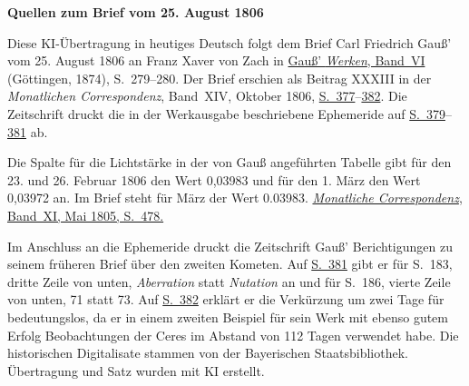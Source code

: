 \clearpage\thispagestyle{empty}
\begin{center}\textbf{Quellen zum Brief vom 25. August 1806}\end{center}
\noindent Diese KI-Übertragung in heutiges Deutsch folgt dem Brief Carl Friedrich Gauß’ vom 25. August 1806 an Franz Xaver von Zach in \href{https://gdz.sub.uni-goettingen.de/id/PPN236007467}{Gauß’ \textit{Werken}, Band~VI} (Göttingen, 1874), S.~279--280. Der Brief erschien als Beitrag XXXIII in der \textit{Monatlichen Correspondenz}, Band~XIV, Oktober 1806, \href{https://www.digitale-sammlungen.de/en/view/bsb10538606?page=393}{S.~377}--\href{https://www.digitale-sammlungen.de/en/view/bsb10538606?page=398}{382}. Die Zeitschrift druckt die in der Werkausgabe beschriebene Ephemeride auf \href{https://www.digitale-sammlungen.de/en/view/bsb10538606?page=395}{S.~379}--\href{https://www.digitale-sammlungen.de/en/view/bsb10538606?page=397}{381} ab.
\par\medskip
Die Spalte für die Lichtstärke in der von Gauß angeführten Tabelle gibt für den 23. und 26. Februar 1806 den Wert 0,03983 und für den 1. März den Wert 0,03972 an. Im Brief steht für März der Wert 0.03983. \href{https://www.digitale-sammlungen.de/en/view/bsb10538603?page=492}{\textit{Monatliche Correspondenz}, Band~XI, Mai 1805, S.~478.}
\par\medskip
Im Anschluss an die Ephemeride druckt die Zeitschrift Gauß’ Berichtigungen zu seinem früheren Brief über den zweiten Kometen. Auf \href{https://www.digitale-sammlungen.de/en/view/bsb10538606?page=397}{S.~381} gibt er für S.~183, dritte Zeile von unten, \emph{Aberration} statt \emph{Nutation} an und für S.~186, vierte Zeile von unten, 71 statt 73. Auf \href{https://www.digitale-sammlungen.de/en/view/bsb10538606?page=398}{S.~382} erklärt er die Verkürzung um zwei Tage für bedeutungslos, da er in einem zweiten Beispiel für sein Werk mit ebenso gutem Erfolg Beobachtungen der Ceres im Abstand von 112 Tagen verwendet habe. Die historischen Digitalisate stammen von der Bayerischen Staatsbibliothek. Übertragung und Satz wurden mit KI erstellt.
\clearpage
